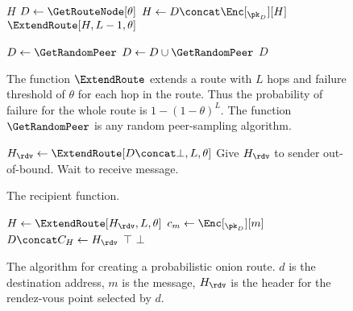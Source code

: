 \begin{figure}
  \begin{algorithmic}
        \State \Return $H$
      \EndIf
      \State $D\gets \GetRouteNode[\theta]$
      \State $H\gets D\concat \Enc[_{\pk_{D}}][H]$
      \State \Return $\ExtendRoute[H, L-1, \theta]$
    \EndFunction

    \Function{\GetRouteNode}{$\theta$}
      \State $D\gets \GetRandomPeer$
        \State $D\gets D\cup \GetRandomPeer$
      \EndWhile
      \State \Return $D$
    \EndFunction
  \end{algorithmic}
  \caption{%
    The function \(\ExtendRoute\) extends a route with \(L\) hops and failure 
    threshold of \(\theta\) for each hop in the route.
    Thus the probability of failure for the whole route is \(1 - (1 - 
      \theta)^L\).
    The function \(\GetRandomPeer\) is any random peer-sampling algorithm.
  }
\end{figure}

\begin{figure}
  \begin{algorithmic}
      \State $H_\rdv\gets \ExtendRoute[D\concat \bot, L, \theta]$
      \State Give $H_\rdv$ to sender out-of-bound.
      \State Wait to receive message.
    \EndFunction
  \end{algorithmic}
  \caption{\label{SPORRecv}%
    The recipient function.%
  }
\end{figure}

\begin{figure}
  \begin{algorithmic}
      \State $H\gets \ExtendRoute[H_\rdv, L, \theta]$
      \State $c_m\gets \Enc[_{\pk_D}][m]$
      \State $D\concat C_H\gets H_\rdv$
          \State \Return $\top$
        \EndIf
      \EndFor
      \State \Return $\bot$
    \EndFunction
  \end{algorithmic}
  \caption{\label{SPORSend}%
    The algorithm for creating a probabilistic onion route.
    \(d\) is the destination address, \(m\) is the message, \(H_\rdv\) is the 
    header for the rendez-vous point selected by \(d\).%
  }
\end{figure}

